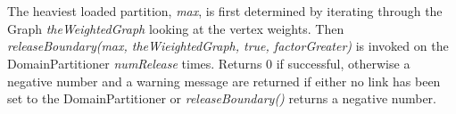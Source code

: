  \\
 \\ 
The heaviest loaded partition, {\em max}, is first determined by
iterating through the Graph {\em theWeightedGraph} looking at the
vertex weights. Then {\em releaseBoundary(max, theWieightedGraph,
true, factorGreater)} is invoked on the
DomainPartitioner {\em numRelease} times. Returns $0$ if successful,
otherwise a negative number and a warning message are returned if
either no link has been set to the DomainPartitioner or {\em
releaseBoundary()} returns a negative number. \\



